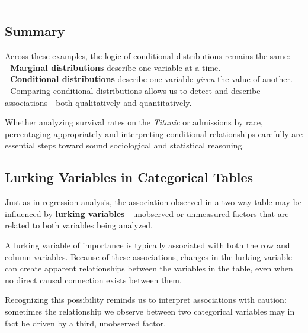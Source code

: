 \documentclass[
  letterpaper,
  DIV=11,
  numbers=noendperiod]{scrreprt}
\begin{document}
\begin{center}\rule{0.5\linewidth}{0.5pt}\end{center}

\subsection{Summary}\label{summary}

Across these examples, the logic of conditional distributions remains
the same:\\
- \textbf{Marginal distributions} describe one variable at a time.\\
- \textbf{Conditional distributions} describe one variable \emph{given}
the value of another.\\
- Comparing conditional distributions allows us to detect and describe
associations---both qualitatively and quantitatively.

Whether analyzing survival rates on the \emph{Titanic} or admissions by
race, percentaging appropriately and interpreting conditional
relationships carefully are essential steps toward sound sociological
and statistical reasoning.

\subsection{Lurking Variables in Categorical
Tables}\label{lurking-variables-in-categorical-tables}

Just as in regression analysis, the association observed in a two-way
table may be influenced by \textbf{lurking variables}---unobserved or
unmeasured factors that are related to both variables being analyzed.

A lurking variable of importance is typically associated with both the
row and column variables. Because of these associations, changes in the
lurking variable can create apparent relationships between the variables
in the table, even when no direct causal connection exists between them.

Recognizing this possibility reminds us to interpret associations with
caution: sometimes the relationship we observe between two categorical
variables may in fact be driven by a third, unobserved factor.
\end{document}
